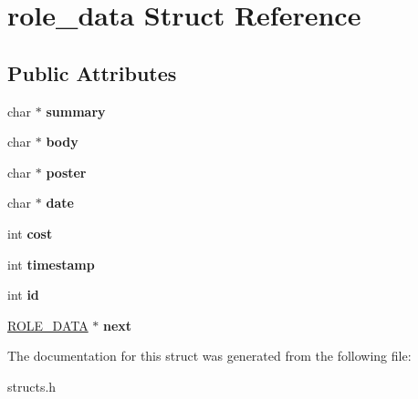 \hypertarget{structrole__data}{\section{role\-\_\-data Struct Reference}
\label{structrole__data}
}
\subsection*{Public Attributes}
\begin{DoxyCompactItemize}
\item 
\hypertarget{structrole__data_a2c9149ce91fbdf296bc7e6f5c1d49b74}{char $\ast$ {\bfseries summary}}\label{structrole__data_a2c9149ce91fbdf296bc7e6f5c1d49b74}

\item 
\hypertarget{structrole__data_a52171559fdafc63e0383f45bd0db9c30}{char $\ast$ {\bfseries body}}\label{structrole__data_a52171559fdafc63e0383f45bd0db9c30}

\item 
\hypertarget{structrole__data_a1868bd646f4a34f7443a8f2646a8799a}{char $\ast$ {\bfseries poster}}\label{structrole__data_a1868bd646f4a34f7443a8f2646a8799a}

\item 
\hypertarget{structrole__data_ac2201dc10fb1e79789b5b0a012603b0f}{char $\ast$ {\bfseries date}}\label{structrole__data_ac2201dc10fb1e79789b5b0a012603b0f}

\item 
\hypertarget{structrole__data_a371b44ddb9a1fa4a8b8d158cc5beaf1e}{int {\bfseries cost}}\label{structrole__data_a371b44ddb9a1fa4a8b8d158cc5beaf1e}

\item 
\hypertarget{structrole__data_a98237a9e860e04d15ba7628144489622}{int {\bfseries timestamp}}\label{structrole__data_a98237a9e860e04d15ba7628144489622}

\item 
\hypertarget{structrole__data_a9d9be7e3de7e18725f2ae12f3a9f4b07}{int {\bfseries id}}\label{structrole__data_a9d9be7e3de7e18725f2ae12f3a9f4b07}

\item 
\hypertarget{structrole__data_aa40a5d46afe438d463675aa5bea0a0ac}{\hyperlink{structrole__data}{R\-O\-L\-E\-\_\-\-D\-A\-T\-A} $\ast$ {\bfseries next}}\label{structrole__data_aa40a5d46afe438d463675aa5bea0a0ac}

\end{DoxyCompactItemize}


The documentation for this struct was generated from the following file\-:\begin{DoxyCompactItemize}
\item 
structs.\-h\end{DoxyCompactItemize}
